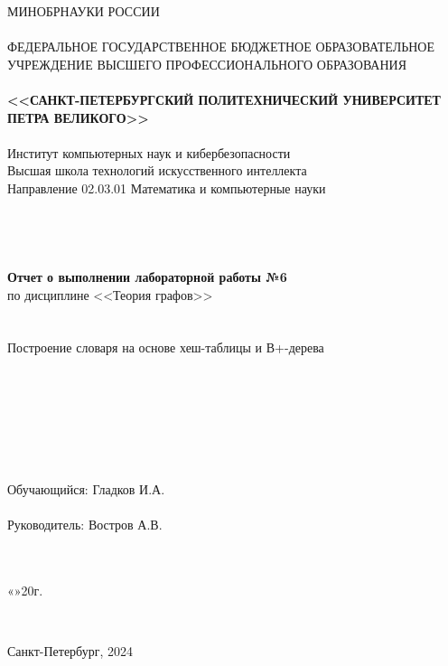 \documentclass[10pt,a4paper,final]{article} %
\begin{document}
\thispagestyle{empty}

\begin{center}
	{\Large МИНОБРНАУКИ РОССИИ}\\
	~\\
	{\large ФЕДЕРАЛЬНОЕ ГОСУДАРСТВЕННОЕ БЮДЖЕТНОЕ ОБРАЗОВАТЕЛЬНОЕ УЧРЕЖДЕНИЕ ВЫСШЕГО ПРОФЕССИОНАЛЬНОГО ОБРАЗОВАНИЯ}\\
	~\\
	{\Large \bf <<САНКТ-ПЕТЕРБУРГСКИЙ ПОЛИТЕХНИЧЕСКИЙ УНИВЕРСИТЕТ ПЕТРА ВЕЛИКОГО>>}\\
	~\\
	{\large Институт компьютерных наук и кибербезопасности}\\
	{\large Высшая школа технологий искусственного интеллекта}\\
	{\large Направление 02.03.01 Математика и компьютерные науки}\\
	~\\
	~\\
	~\\
	~\\
	{\Large \bf Отчет о выполнении лабораторной работы №6}\\
	{\Large по дисциплине <<Теория графов>> }\\
	~\\
	~\\
	
	{\Large  Построение словаря на основе хеш-таблицы и В+-дерева}\\
	
	~\\
	~\\
	~\\
	~\\
	~\\
	~\\
	~\\
	{\large Обучающийся: \underline{\hspace{3.5cm}} \qquad\qquad Гладков И.А.}\\
	~\\
	{\large Руководитель: \underline{\hspace{3.5cm}} \hspace{16mm} Востров А.В.}\\
	~\\
	~\\
\end{center}
\begin{flushright}
	
	«\underline{\hspace{1cm}}»\underline{\hspace{3cm}}20\underline{\hspace{0.7cm}}г.
\end{flushright}
~\\
\begin{center}
	{\large Санкт-Петербург, 2024}
\end{center}
\newpage
\end{document}
